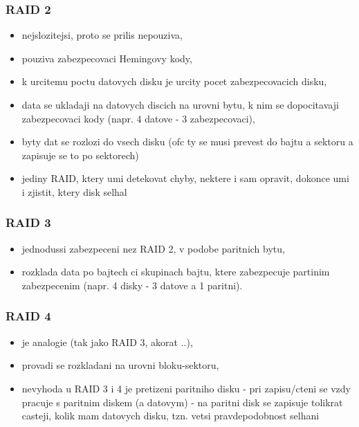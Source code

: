 \documentclass[a4paper, 11pt]{article}
\begin{document}
\subsubsection{RAID 2}
\begin{itemize}
    \item nejslozitejsi, proto se prilis nepouziva,
    \item pouziva zabezpecovaci Hemingovy kody,
    \item k urcitemu poctu datovych disku je urcity pocet zabezpecovacich disku,
    \item data se ukladaji na datovych discich na urovni bytu, k nim se dopocitavaji zabezpecovaci kody (napr. 4 datove - 3 zabezpecovaci),
    \item byty dat se rozlozi do vsech disku (ofc ty se musi prevest do bajtu a sektoru a zapisuje se to po sektorech)
    \item jediny RAID, ktery umi detekovat chyby, nektere i sam opravit, dokonce umi i zjistit, ktery disk selhal \\
\end{itemize}

\newpage

\subsubsection{RAID 3}
\begin{itemize}
    \item jednodussi zabezpeceni nez RAID 2, v podobe paritnich bytu,
    \item rozklada data po bajtech ci skupinach bajtu, ktere zabezpecuje partinim zabezpecenim (napr. 4 disky - 3 datove a 1 paritni). \\
\end{itemize}

\subsubsection{RAID 4}
\begin{itemize}
    \item je analogie (tak jako RAID 3, akorat ..),
    \item provadi se rozkladani na urovni bloku-sektoru,
    \item nevyhoda u RAID 3 i 4 je pretizeni paritniho disku - pri zapisu/cteni se vzdy pracuje s paritnim diskem (a datovym) - na paritni disk se zapisuje tolikrat casteji, kolik mam datovych disku, tzn. vetsi pravdepodobnost selhani \\
\end{itemize}
\end{document}
